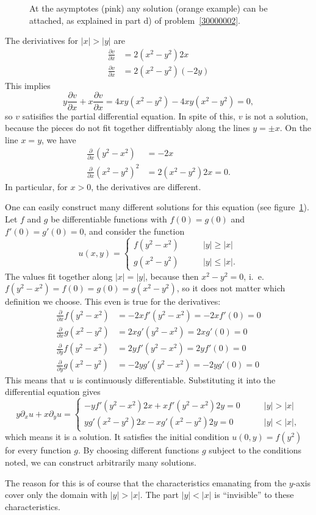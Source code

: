 \begin{loesung}
\begin{teilaufgaben}
\begin{figure}
{At the asymptotes (pink) any solution (orange example) can be attached,
as explained in
part d) of problem~\ref{30000002}.
\label{30000002:solutionfigure}}
\end{figure}
\item
The deriviatives for $|x|>|y|$ are
\begin{align*}
\frac{\partial v}{\partial x}
&=2(x^2-y^2)2x\\
\frac{\partial v}{\partial x}
&=2(x^2-y^2)(-2y)
\end{align*}
This implies
\[
y\frac{\partial v}{\partial x}
+
x \frac{\partial v}{\partial x}
=
4xy(x^2-y^2)
-4xy(x^2-y^2)=0,
\]
so $v$ satisifies the partial differential equation.
In spite of this, $v$ is not a solution, because the pieces do not
fit together diffrentiably along the  lines $y=\pm x$.
On the line $x=y$, we have
\begin{align*}
\frac{\partial}{\partial x}(y^2-x^2)&=-2x\\
\frac{\partial}{\partial x}(x^2-y^2)^2&=2(x^2-y^2)2x=0.
\end{align*}
In particular, for $x>0$, the derivatives are different.
\end{teilaufgaben}

One can easily construct many different solutions for this equation
(see figure~\ref{30000002:solutionfigure}).
Let $f$ and $g$ be differentiable functions with $f(0)=g(0)$
and $f'(0)=g'(0)=0$, and consider the function
\[
u(x,y)=\begin{cases}
f(y^2-x^2)&\qquad |y|\ge|x|\\
g(x^2-y^2)&\qquad |y|\le|x|.
\end{cases}
\]
The values fit together along $|x|=|y|$, because then $x^2-y^2=0$,
i.~e.~$f(y^2-x^2)=f(0)=g(0)=g(x^2-y^2)$, so it does not matter which
definition we choose.
This even is true for the derivatives:
\begin{align*}
\frac{\partial}{\partial x}f(y^2-x^2)&=-2xf'(y^2-x^2)=-2xf'(0)=0
\\
\frac{\partial}{\partial x}g(x^2-y^2)&=2xg'(y^2-x^2)=2xg'(0)=0
\\
\frac{\partial}{\partial y}f(y^2-x^2)&=2yf'(y^2-x^2)=2yf'(0)=0
\\
\frac{\partial}{\partial y}g(x^2-y^2)&=-2yg'(y^2-x^2)=-2yg'(0)=0
\end{align*}
This means that $u$ is continuously differentiable.
Substituting it into the differential equation gives
\[
y\partial_xu+x\partial_yu
=
\begin{cases}
-yf'(y^2-x^2)2x+xf'(y^2-x^2)2y=0&\qquad |y|>|x|\\
yg'(x^2-y^2)2x-xg'(x^2-y^2)2y=0&\qquad |y|<|x|,
\end{cases}
\]
which means it is a solution.
It satisfies the initial condition $u(0,y)=f(y^2)$ for every function $g$.
By choosing different functions $g$ subject to the conditions noted,
we can construct arbitrarily many solutions.

The reason for this is of course that the characteristics emanating from
the $y$-axis cover only the domain with $|y|> |x|$.
The part $|y|<|x|$ is ``invisible'' to these characteristics.
\end{loesung}

